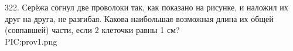 322. Серёжа согнул две проволоки так, как показано на рисунке, и наложил их друг на друга, не разгибая. Какова наибольшая возможная длина их общей (совпавшей) части, если 2 клеточки равны 1 см?\\
{{PIC:prov1.png}}\\
